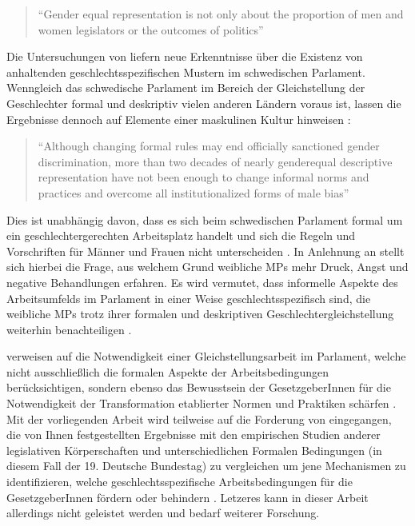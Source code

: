 \documentclass[12pt, 
    twoside=false, 
    bibliography=totoc, 
    numbers=endperiod, 
    headings=normal, 
    toc=chapterentrydotfill
    ]{scrbook}
\begin{document}
\begin{quote}
    \enquote{Gender equal representation is not only about the proportion of men and women legislators or the outcomes of politics}\parencite[197]{erikson_2018}
\end{quote}
 
Die Untersuchungen von \textcite{erikson_2018} liefern neue Erkenntnisse über die Existenz von anhaltenden geschlechtsspezifischen Mustern im schwedischen Parlament. Wenngleich das schwedische Parlament im Bereich der Gleichstellung der Geschlechter formal und deskriptiv vielen anderen Ländern voraus ist, lassen die Ergebnisse dennoch auf Elemente einer maskulinen Kultur hinweisen \parencite[211]{erikson_2018}:

\begin{quote}
    \enquote{Although changing formal rules may end officially sanctioned gender discrimination, more than two decades of nearly genderequal descriptive representation have not been enough to change informal norms and practices and overcome all institutionalized forms of male bias} \parencite[211]{erikson_2018}
\end{quote}

 Dies ist unabhängig davon, dass es sich beim schwedischen Parlament formal um ein geschlechtergerechten Arbeitsplatz handelt und sich die Regeln und Vorschriften für Männer und Frauen nicht unterscheiden \parencite[211]{erikson_2018}. In Anlehnung an \textcite{erikson_2018} stellt sich hierbei die Frage, aus welchem Grund weibliche MPs mehr Druck, Angst und negative Behandlungen erfahren. Es wird vermutet, dass informelle Aspekte des Arbeitsumfelds im Parlament in einer Weise geschlechtsspezifisch sind, die weibliche MPs trotz ihrer formalen und deskriptiven Geschlechtergleichstellung weiterhin benachteiligen \parencite[210]{erikson_2018}.

\textcite{erikson_2018} verweisen auf die Notwendigkeit einer Gleichstellungsarbeit im Parlament, welche nicht ausschließlich die formalen Aspekte der Arbeitsbedingungen berücksichtigen, sondern ebenso das Bewusstsein der GesetzgeberInnen für die Notwendigkeit der Transformation etablierter Normen und Praktiken schärfen \parencite[211]{erikson_2018}.
Mit der vorliegenden Arbeit wird teilweise auf die Forderung von\textcite{erikson_2018} eingegangen, die von Ihnen festgestellten Ergebnisse mit den empirischen Studien anderer legislativen Körperschaften und unterschiedlichen Formalen Bedingungen (in diesem Fall der 19. Deutsche Bundestag) zu vergleichen um jene Mechanismen zu identifizieren, welche geschlechtsspezifische Arbeitsbedingungen für die GesetzgeberInnen fördern oder behindern \parencite[211]{erikson_2018}. Letzeres kann in dieser Arbeit allerdings nicht geleistet werden und bedarf weiterer Forschung. 
\end{document}
